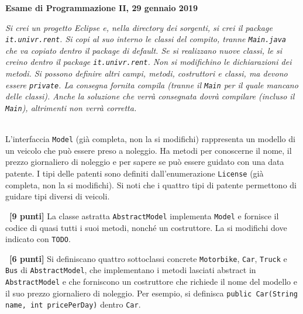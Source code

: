 \documentclass[12pt]{article}
\newcounter{esnu}
\newenvironment{esercizio}{\medskip \noindent {\bf Esercizio\addtocounter{esnu}{1} \arabic{esnu}}}{}
\begin{document}
\begin{center} {\bf Esame di Programmazione II, 29 gennaio 2019}\end{center}

\emph{
Si crei un progetto Eclipse e, nella directory dei sorgenti,
si crei il package \texttt{it.univr.rent}. Si copi al suo interno
le classi del compito, tranne \texttt{Main.java} che va copiato
dentro il package di default.
Se si realizzano nuove classi, le si creino dentro
il package \texttt{it.univr.rent}.
Non si modifichino le dichiarazioni dei metodi. Si possono definire altri campi,
metodi, costruttori e classi, ma devono essere \texttt{private}.
La consegna fornita compila (tranne il \texttt{Main} per il quale mancano delle classi).
Anche la soluzione che verr\`a consegnata dovr\`a compilare (incluso il \texttt{Main}),
altrimenti non verr\`a corretta.
}

\mbox{}\\

L'interfaccia \texttt{Model} (gi\`a completa, non la si modifichi)
rappresenta un modello di un veicolo che pu\`o essere preso a noleggio.
Ha metodi per conoscerne il nome, il prezzo giornaliero di noleggio e per sapere
se pu\`o essere guidato con una data patente. I tipi delle patenti sono definiti
dall'enumerazione \texttt{License} (gi\`a completa, non la si modifichi). Si noti
che i quattro tipi di patente permettono di guidare tipi diversi di veicoli.

\begin{esercizio}~\textbf{[9 punti]}
  La classe astratta \texttt{AbstractModel} implementa \texttt{Model} e
  fornisce il codice di quasi tutti i suoi metodi, nonch\'e un costruttore.
  La si modifichi dove indicato con \texttt{TODO}.
\end{esercizio}

\begin{esercizio}~\textbf{[6 punti]}
  Si definiscano quattro sottoclassi concrete \texttt{Motorbike}, \texttt{Car}, \texttt{Truck} e
  \texttt{Bus} di \texttt{AbstractModel}, che implementano i metodi lasciati abstract in
  \texttt{AbstractModel} e che
  forniscono un costruttore che richiede il nome del modello e il suo prezzo giornaliero di noleggio.
  Per esempio, si definisca \texttt{public Car(String name, int pricePerDay)} dentro \texttt{Car}.
\end{esercizio}
\end{document}
